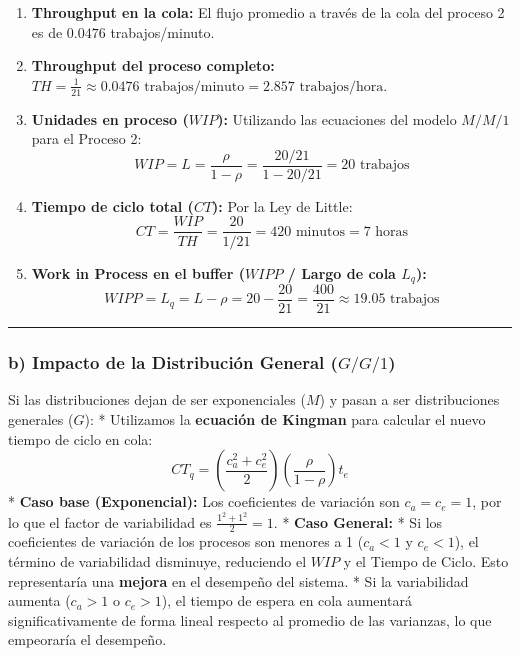 \documentclass[
]{article}
\providecommand{\tightlist}{%
  \setlength{\itemsep}{0pt}\setlength{\parskip}{0pt}}
\begin{document}
\begin{enumerate}
\def\labelenumi{\arabic{enumi}.}
\tightlist
\item
  \textbf{Throughput en la cola:} El flujo promedio a través de la cola
  del proceso 2 es de \(0.0476\) trabajos/minuto.
\item
  \textbf{Throughput del proceso completo:}
  \(TH = \frac{1}{21} \approx 0.0476 \text{ trabajos/minuto} = 2.857 \text{ trabajos/hora}\).
\item
  \textbf{Unidades en proceso (\(WIP\)):} Utilizando las ecuaciones del
  modelo \(M/M/1\) para el Proceso 2:
  \[WIP = L = \frac{\rho}{1 - \rho} = \frac{20/21}{1 - 20/21} = 20 \text{ trabajos}\]
\item
  \textbf{Tiempo de ciclo total (\(CT\)):} Por la Ley de Little:
  \[CT = \frac{WIP}{TH} = \frac{20}{1/21} = 420 \text{ minutos} = 7 \text{ horas}\]
\item
  \textbf{Work in Process en el buffer (\(WIPP\) / Largo de cola
  \(L_q\)):}
  \[WIPP = L_q = L - \rho = 20 - \frac{20}{21} = \frac{400}{21} \approx 19.05 \text{ trabajos}\]
\end{enumerate}

\begin{center}\rule{0.5\linewidth}{0.5pt}\end{center}

\hypertarget{b-impacto-de-la-distribuciuxf3n-general-gg1}{%
\subsubsection{\texorpdfstring{b) Impacto de la Distribución General
(\(G/G/1\))}{b) Impacto de la Distribución General (G/G/1)}}\label{b-impacto-de-la-distribuciuxf3n-general-gg1}}

Si las distribuciones dejan de ser exponenciales (\(M\)) y pasan a ser
distribuciones generales (\(G\)): * Utilizamos la \textbf{ecuación de
Kingman} para calcular el nuevo tiempo de ciclo en cola:
\[CT_q = \left( \frac{c_a^2 + c_e^2}{2} \right) \left( \frac{\rho}{1 - \rho} \right) t_e\]
* \textbf{Caso base (Exponencial):} Los coeficientes de variación son
\(c_a = c_e = 1\), por lo que el factor de variabilidad es
\(\frac{1^2 + 1^2}{2} = 1\). * \textbf{Caso General:} * Si los
coeficientes de variación de los procesos son menores a 1 (\(c_a < 1\) y
\(c_e < 1\)), el término de variabilidad disminuye, reduciendo el
\(WIP\) y el Tiempo de Ciclo. Esto representaría una \textbf{mejora} en
el desempeño del sistema. * Si la variabilidad aumenta (\(c_a > 1\) o
\(c_e > 1\)), el tiempo de espera en cola aumentará significativamente
de forma lineal respecto al promedio de las varianzas, lo que empeoraría
el desempeño.
\end{document}
